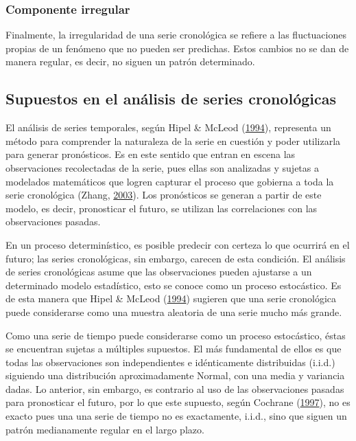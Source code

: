 \documentclass[
]{article}
\begin{document}
\subsubsection{Componente irregular}

Finalmente, la irregularidad de una serie cronológica se refiere a las
fluctuaciones propias de un fenómeno que no pueden ser predichas. Estos
cambios no se dan de manera regular, es decir, no siguen un patrón
determinado.

\subsection{Supuestos en el análisis de series cronológicas}

El análisis de series temporales, según Hipel \& McLeod
(\protect\hyperlink{ref-Hipel}{1994}), representa un método para
comprender la naturaleza de la serie en cuestión y poder utilizarla para
generar pronósticos. Es en este sentido que entran en escena las
observaciones recolectadas de la serie, pues ellas son analizadas y
sujetas a modelados matemáticos que logren capturar el proceso que
gobierna a toda la serie cronológica (Zhang,
\protect\hyperlink{ref-Zhang}{2003}). Los pronósticos se generan a
partir de este modelo, es decir, pronosticar el futuro, se utilizan las
correlaciones con las observaciones pasadas.

En un proceso determinístico, es posible predecir con certeza lo que
ocurrirá en el futuro; las series cronológicas, sin embargo, carecen de
esta condición. El análisis de series cronológicas asume que las
observaciones pueden ajustarse a un determinado modelo estadístico, esto
se conoce como un proceso estocástico. Es de esta manera que Hipel \&
McLeod (\protect\hyperlink{ref-Hipel}{1994}) sugieren que una serie
cronológica puede considerarse como una muestra aleatoria de una serie
mucho más grande.

Como una serie de tiempo puede considerarse como un proceso estocástico,
éstas se encuentran sujetas a múltiples supuestos. El más fundamental de
ellos es que todas las observaciones son independientes e idénticamente
distribuidas (i.i.d.) siguiendo una distribución aproximadamente Normal,
con una media y variancia dadas. Lo anterior, sin embargo, es contrario
al uso de las observaciones pasadas para pronosticar el futuro, por lo
que este supuesto, según Cochrane
(\protect\hyperlink{ref-Cochrane}{1997}), no es exacto pues una una
serie de tiempo no es exactamente, i.i.d., sino que siguen un patrón
medianamente regular en el largo plazo.
\end{document}
